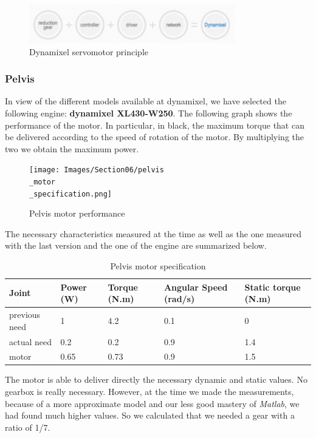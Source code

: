 \begin{figure}[ht]
    \centering
    \includegraphics[width=0.8\textwidth]{Images/Section06/dynamixel.png}
    \caption{Dynamixel servomotor principle}
    \label{fig:DynamixelPrinciple}
\end{figure}
\FloatBarrier

\subsubsection{Pelvis}

In view of the different models available at dynamixel, we have selected the following engine: \textbf{dynamixel XL430-W250}. The following graph shows the performance of the motor. In particular, in black, the maximum torque that can be delivered according to the speed of rotation of the motor. By multiplying the two we obtain the maximum power.
\begin{figure}[ht]
    \centering
    \texttt{[image: Images/Section06/pelvis\\\_motor\\\_specification.png]}
    \caption{Pelvis motor performance}
    \label{fig:PelvisMotor}
\end{figure}
\FloatBarrier

\bigbreak
The necessary characteristics measured at the time as well as the one measured with the last version and the one of the engine are summarized below.
\begin{table}[ht]
    \centering
    \begin{tabular}{|p{1.5cm} | p{2cm} | p{2.5cm}| p{2.7cm} | p{2.7cm} |} 
        \hline
        \textbf{Joint}& \textbf{Power (W)} & \textbf{Torque (N.m)} & \textbf{Angular Speed (rad/s)} & \textbf{Static torque (N.m)}\\ [0.3ex]
        \hline
        previous need & 1 & 4.2 & 0.1 & 0 \\ 
        \hline
        actual need & 0.2 & 0.2 & 0.9 & 1.4 \\ 
        \hline
        motor & 0.65 & 0.73 & 0.9 & 1.5\\ 
        \hline
    \end{tabular}
    \caption{Pelvis motor specification}
\end{table}
\FloatBarrier
The motor is able to deliver directly the necessary dynamic and static values. No gearbox is really necessary. However, at the time we made the measurements, because of a more approximate model and our less good mastery of \textit{Matlab}, we had found much higher values. So we calculated that we needed a gear with a ratio of 1/7.

